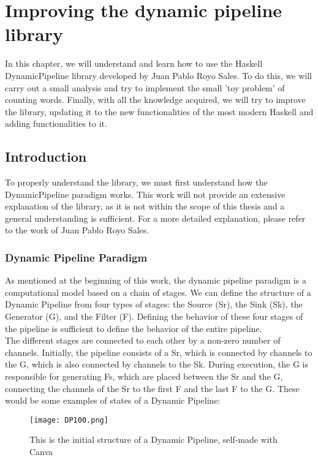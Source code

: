 \chapter{Improving the dynamic pipeline library} \label{IDPL}
In this chapter, we will understand and learn how to use the Haskell DynamicPipeline library developed by Juan Pablo Royo Sales.
To do this, we will carry out a small analysis and try to implement the small 'toy problem' of counting words.
Finally, with all the knowledge acquired, we will try to improve the library, updating it to the new functionalities of the most modern Haskell and adding functionalities to it. 
\section{Introduction}
To properly understand the library, we must first understand how the DynamicPipeline paradigm works.
This work will not provide an extensive explanation of the library, as it is not within the scope of this thesis and a general understanding is sufficient.
For a more detailed explanation, please refer to the work of Juan Pablo Royo Sales.
\subsection*{Dynamic Pipeline Paradigm}
As mentioned at the beginning of this work, the dynamic pipeline paradigm is a computational model based on a chain of stages.
We can define the structure of a Dynamic Pipeline from four types of stages: the Source (Sr), the Sink (Sk), the Generator (G), and the Filter (F).
Defining the behavior of these four stages of the pipeline is sufficient to define the behavior of the entire pipeline. \\

The different stages are connected to each other by a non-zero number of channels.
Initially, the pipeline consists of a Sr, which is connected by channels to the G, which is also connected by channels to the Sk.
During execution, the G is responsible for generating Fs, which are placed between the Sr and the G, connecting the channels of the Sr to the first F and the last F to the G.
These would be some examples of states of a Dynamic Pipeline:

\begin{figure}[H]
    \centering
    \texttt{[image: DP100.png]}
    \caption[{[Lib] Initia structure of a DP}]{This is the initial structure of a Dynamic Pipeline, self-made with Canva}
    \label{fig:DP100}
\end{figure}

